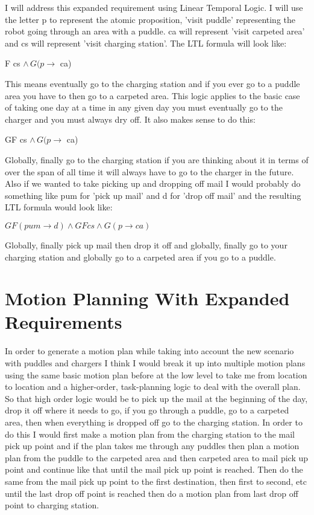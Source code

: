 \documentclass{article}
\begin{document}
I will address this expanded requirement using Linear Temporal Logic. I will use the letter p to represent the atomic proposition, 'visit puddle' representing the robot going through an area with a puddle.
ca will represent 'visit carpeted area' and cs will represent 'visit charging station'.
The LTL formula will look like:

F cs $\land \, G(p \rightarrow$ ca)

This means eventually go to the charging station and if you ever go to a puddle area you have to then go to a carpeted area.
This logic applies to the basic case of taking one day at a time in any given day you must eventually go to the charger and you must always dry off.
It also makes sense to do this:

GF cs $\land \, G(p \rightarrow$ ca)

Globally, finally go to the charging station if you are thinking about it in terms of over the span of all time it will always have to go to the charger in the future.
Also if we wanted to take picking up and dropping off mail I would probably do something like pum for 'pick up mail' and d for 'drop off mail' and the resulting LTL formula would look like:

$GF(pum \rightarrow d) \land GF cs \land G(p \rightarrow ca)$

Globally, finally pick up mail then drop it off and globally, finally go to your charging station and globally go to a carpeted area if you go to a puddle.

\section{Motion Planning With Expanded Requirements}

In order to generate a motion plan while taking into account the new scenario with puddles and chargers I think I would break it up into multiple motion plans using the same basic motion plan before at the low level to take me from location to location and a higher-order, task-planning logic to deal with the overall plan.
So that high order logic would be to pick up the mail at the beginning of the day, drop it off where it needs to go, if you go through a puddle, go to a carpeted area, then when everything is dropped off go to the charging station.
In order to do this I would first make a motion plan from the charging station to the mail pick up point and if the plan takes me through any puddles then plan a motion plan from the puddle to the carpeted area and then carpeted area to mail pick up point and continue like that until the mail pick up point is reached.
Then do the same from the mail pick up point to the first destination, then first to second, etc until the last drop off point is reached then do a motion plan from last drop off point to charging station.
\end{document}
